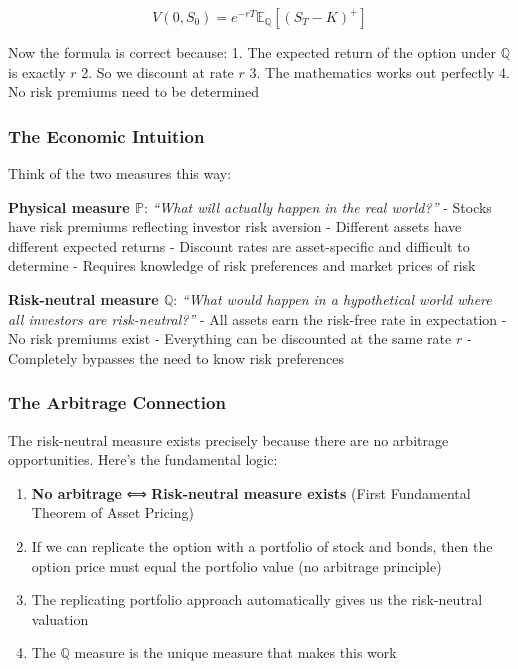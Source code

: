 \documentclass[
  letterpaper,
  DIV=11,
  numbers=noendperiod]{scrartcl}
\providecommand{\tightlist}{%
  \setlength{\itemsep}{0pt}\setlength{\parskip}{0pt}}\usepackage{longtable,booktabs,array}
\begin{document}
\begin{tcolorbox}
\[V(0, S_0) = e^{-rT} \mathbb{E}_\mathbb{Q}[(S_T - K)^+]\]

Now the formula is correct because: 1. The expected return of the option
under \(\mathbb{Q}\) is exactly \(r\) 2. So we discount at rate \(r\) 3.
The mathematics works out perfectly 4. No risk premiums need to be
determined

\hypertarget{the-economic-intuition}{%
\subsubsection{The Economic Intuition}\label{the-economic-intuition}}

Think of the two measures this way:

\textbf{Physical measure \(\mathbb{P}\)}: \emph{``What will actually
happen in the real world?''} - Stocks have risk premiums reflecting
investor risk aversion - Different assets have different expected
returns - Discount rates are asset-specific and difficult to determine -
Requires knowledge of risk preferences and market prices of risk

\textbf{Risk-neutral measure \(\mathbb{Q}\)}: \emph{``What would happen
in a hypothetical world where all investors are risk-neutral?''} - All
assets earn the risk-free rate in expectation - No risk premiums exist -
Everything can be discounted at the same rate \(r\) - Completely
bypasses the need to know risk preferences

\hypertarget{the-arbitrage-connection}{%
\subsubsection{The Arbitrage
Connection}\label{the-arbitrage-connection}}

The risk-neutral measure exists precisely because there are no arbitrage
opportunities. Here's the fundamental logic:

\begin{enumerate}
\def\labelenumi{\arabic{enumi}.}
\tightlist
\item
  \textbf{No arbitrage} ⟺ \textbf{Risk-neutral measure exists} (First
  Fundamental Theorem of Asset Pricing)
\item
  If we can replicate the option with a portfolio of stock and bonds,
  then the option price must equal the portfolio value (no arbitrage
  principle)
\item
  The replicating portfolio approach automatically gives us the
  risk-neutral valuation
\item
  The \(\mathbb{Q}\) measure is the unique measure that makes this work
\end{enumerate}


\end{tcolorbox}
\end{document}
